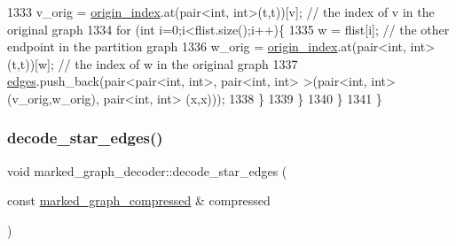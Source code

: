 \begin{DoxyCode}
1333       v\_orig = \hyperlink{classmarked__graph__decoder_aab3e2f6d4376ba96da32f25aa9ddd069}{origin\_index}.at(pair<int, int>(t,t))[v]; \textcolor{comment}{// the index of v in the original graph
       }
1334       \textcolor{keywordflow}{for} (\textcolor{keywordtype}{int} i=0;i<flist.size();i++)\{
1335         w = flist[i]; \textcolor{comment}{// the other endpoint in the partition graph}
1336         w\_orig = \hyperlink{classmarked__graph__decoder_aab3e2f6d4376ba96da32f25aa9ddd069}{origin\_index}.at(pair<int, int>(t,t))[w]; \textcolor{comment}{// the index of w in the original
       graph}
1337         \hyperlink{classmarked__graph__decoder_af9e75da0a495d9c3bdcd169e15e3261e}{edges}.push\_back(pair<pair<int, int>, pair<int, int> >(pair<int, int>(v\_orig,w\_orig), pair<int,
       int> (x,x)));
1338       \}
1339     \}
1340   \}
1341 \}
\end{DoxyCode}
\mbox{\label{classmarked__graph__decoder_a79fcfb8d5616c691114ebc0a7adb18b2}} 
\subsubsection{\texorpdfstring{decode\+\_\+star\+\_\+edges()}{decode\_star\_edges()}}
{\footnotesize\ttfamily void marked\+\_\+graph\+\_\+decoder\+::decode\+\_\+star\+\_\+edges (\begin{DoxyParamCaption}\item[{const \hyperlink{classmarked__graph__compressed}{marked\+\_\+graph\+\_\+compressed} \&}]{compressed }\end{DoxyParamCaption})\hspace{0.3cm}{\ttfamily [private]}}


